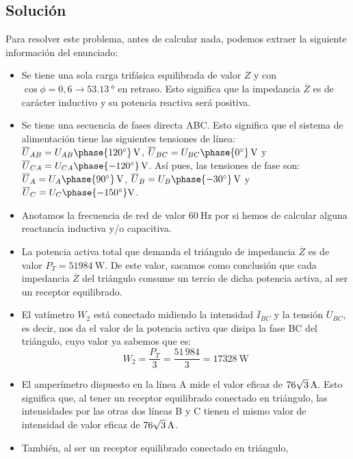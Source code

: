 \subsection*{Solución}

Para resolver este problema, antes de calcular
nada, podemos extraer la siguiente información del enunciado:
\begin{itemize} %
\item Se tiene una sola carga trifásica equilibrada de valor $Z$ y con
  $\cos{\phi}=0,6\rightarrow \qty{53.13}{\degree}$ en retraso. Esto
  significa que la impedancia $\overline{Z}$ es de carácter inductivo
  y su potencia reactiva será positiva.
\item Se tiene una secuencia de fases directa ABC. Esto significa que
  el sistema de alimentación tiene las siguientes tensiones de línea:
  $\overline{U}_{AB}={U_{AB}\phase{\ang{120}}}\,\unit{\volt}$,
  $\overline{U}_{BC}={U_{BC}\phase{\ang{0}}}\,\unit{\volt}$
  y
  $\overline{U}_{CA}={U_{CA}\phase{\ang{-120}}}\,\unit{\volt}$. Así
  pues, las tensiones de fase son:
  $\overline{U}_{A}={U_{A}\phase{\ang{90}}}\,\unit{\volt}$,
  $\overline{U}_{B}={U_{B}\phase{\ang{-30}}}\,\unit{\volt}$
  y
  $\overline{U}_{C}={U_{C}\phase{\ang{-150}}}\unit{\volt}$.
\item Anotamos la frecuencia de red de valor $\qty{60}{\hertz}$ por si
  hemos de calcular alguna reactancia inductiva y/o capacitiva.
\item La potencia activa total que demanda el triángulo de impedancia
  $\overline{Z}$ es de valor $P_T=\qty{51984}{\watt}$. De este valor,
  sacamos como conclusión que cada impedancia $\overline{Z}$ del
  triángulo consume un tercio de dicha potencia activa, al ser un
  receptor equilibrado.
\item El vatímetro $W_2$ está conectado midiendo la intensidad
  $\overline{I}_{BC}$ y la tensión $\overline{U}_{BC}$, es decir, nos
  da el valor de la potencia activa que disipa la fase BC del
  triángulo, cuyo valor ya sabemos que es:
  \[
    W_2=\dfrac{P_T}{3}=\dfrac{51\,984}{3}=\qty{17328}{\watt}
  \]
\item El amperímetro dispuesto en la línea A mide el valor eficaz de
  $\qty[parse-numbers=false]{76\sqrt{3}}{\ampere}$. Esto significa que,
  al tener un receptor equilibrado conectado en triángulo, las
  intensidades por las otras dos líneas B y C tienen el mismo valor de
  intensidad de valor eficaz de
  $\qty[parse-numbers=false]{76\sqrt{3}}{\ampere}$.
\item También, al ser un receptor equilibrado conectado en triángulo,

\end{itemize}

